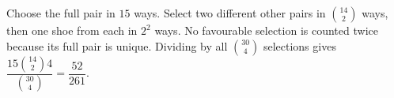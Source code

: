 Choose the full pair in $15$ ways. Select two different other pairs in $\binom{14}{2}$ ways, then one shoe from each in $2^2$ ways. No favourable selection is counted twice because its full pair is unique. Dividing by all $\binom{30}{4}$ selections gives $\boxed{\dfrac{15\binom{14}{2}4}{\binom{30}{4}}=\dfrac{52}{261}}$.
